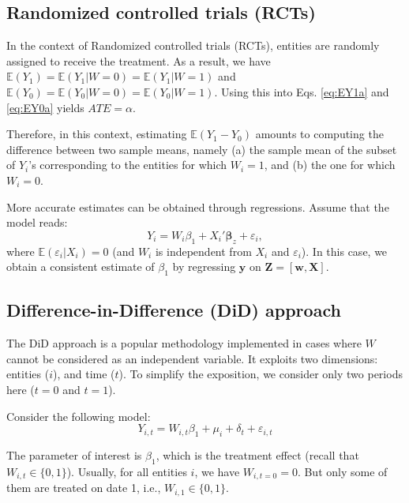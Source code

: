 \documentclass[
  12pt,
]{book}
\theoremstyle{definition}
\theoremstyle{definition}
\theoremstyle{definition}
\theoremstyle{definition}
\theoremstyle{remark}
\begin{document}
\hypertarget{randomized-controlled-trials-rcts}{%
\subsection{Randomized controlled trials (RCTs)}\label{randomized-controlled-trials-rcts}}

In the context of Randomized controlled trials (RCTs), entities are randomly assigned to receive the treatment. As a result, we have \(\mathbb{E}(Y_1) = \mathbb{E}(Y_1|W=0) = \mathbb{E}(Y_1|W=1)\) and \(\mathbb{E}(Y_0) = \mathbb{E}(Y_0|W=0) = \mathbb{E}(Y_0|W=1)\). Using this into Eqs. \eqref{eq:EY1a} and \eqref{eq:EY0a} yields \(ATE = \alpha\).

Therefore, in this context, estimating \(\mathbb{E}(Y_1-Y_0)\) amounts to computing the difference between two sample means, namely (a) the sample mean of the subset of \(Y_i\)'s corresponding to the entities for which \(W_i=1\), and (b) the one for which \(W_i=0\).

More accurate estimates can be obtained through regressions. Assume that the model reads:
\[
Y_{i} = W_{i} \beta_{1} + X_i'\boldsymbol\beta_z + \varepsilon_i,
\]
where \(\mathbb{E}(\varepsilon_i|X_i) = 0\) (and \(W_i\) is independent from \(X_i\) and \(\varepsilon_i\)). In this case, we obtain a consistent estimate of \(\beta_1\) by regressing \(\mathbf{y}\) on \(\mathbf{Z} = [\mathbf{w},\mathbf{X}]\).

\hypertarget{difference-in-difference-did-approach}{%
\subsection{Difference-in-Difference (DiD) approach}\label{difference-in-difference-did-approach}}

The DiD approach is a popular methodology implemented in cases where \(W\) cannot be considered as an independent variable. It exploits two dimensions: entities (\(i\)), and time (\(t\)). To simplify the exposition, we consider only two periods here (\(t=0\) and \(t=1\)).

Consider the following model:
\begin{equation}
Y_{i,t} = W_{i,t} \beta_1 + \mu_i + \delta_t + \varepsilon_{i,t}\label{eq:DiD}
\end{equation}

The parameter of interest is \(\beta_{1}\), which is the treatment effect (recall that \(W_{i,t} \in \{0,1\}\)). Usually, for all entities \(i\), we have \(W_{i,t=0}=0\). But only some of them are treated on date 1, i.e., \(W_{i,1} \in \{0,1\}\).
\end{document}

